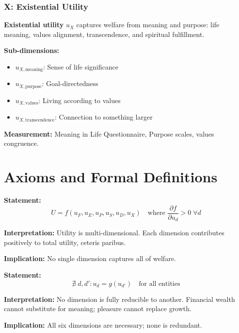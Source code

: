 \subsubsection{X: Existential Utility}

\begin{definition}
\textbf{Existential utility} $u_X$ captures welfare from meaning and purpose:
life meaning, values alignment, transcendence, and spiritual fulfillment.
\end{definition}

\textbf{Sub-dimensions:}
\begin{itemize}[nosep]
\item $u_{X,\text{meaning}}$: Sense of life significance
\item $u_{X,\text{purpose}}$: Goal-directedness
\item $u_{X,\text{values}}$: Living according to values
\item $u_{X,\text{transcendence}}$: Connection to something larger
\end{itemize}

\textbf{Measurement:} Meaning in Life Questionnaire, Purpose scales, values congruence.


\section{Axioms and Formal Definitions}
\label{sec:what-axioms}

\begin{tcolorbox}[colback=gray!5!white, colframe=gray!75!black,
    title=Axiom DIM-1: Multi-Dimensionality]
\textbf{Statement:}
\begin{equation}
U = f(u_F, u_E, u_P, u_S, u_D, u_X) \quad \text{where } \frac{\partial f}{\partial u_d} > 0 \; \forall d
\end{equation}

\textbf{Interpretation:} Utility is multi-dimensional. Each dimension contributes
positively to total utility, ceteris paribus.

\textbf{Implication:} No single dimension captures all of welfare.
\end{tcolorbox}

\begin{tcolorbox}[colback=gray!5!white, colframe=gray!75!black,
    title=Axiom DIM-2: Irreducibility]
\textbf{Statement:}
\begin{equation}
\nexists \; d, d': u_d = g(u_{d'}) \quad \text{for all entities}
\end{equation}

\textbf{Interpretation:} No dimension is fully reducible to another.
Financial wealth cannot substitute for meaning; pleasure cannot replace growth.

\textbf{Implication:} All six dimensions are necessary; none is redundant.
\end{tcolorbox}


